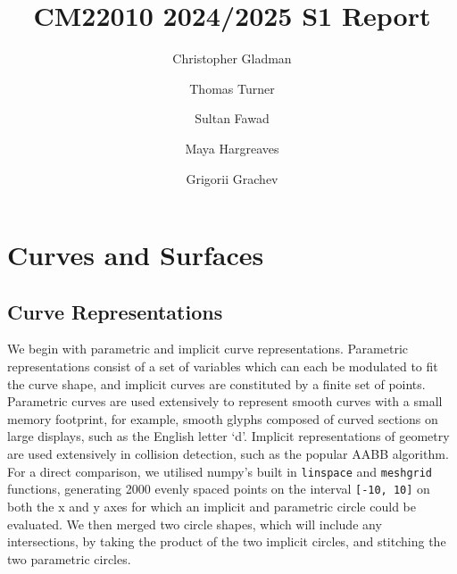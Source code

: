 \documentclass[10pt,a4paper]{article}
\begin{document}
\title{CM22010 2024/2025 S1 Report}
\author{Christopher Gladman}
\author{Thomas Turner}
\author{Sultan Fawad}
\author{Maya Hargreaves}
\author{Grigorii Grachev}
\maketitle

\section{Curves and Surfaces}

\subsection{Curve Representations}
We begin with parametric and implicit curve representations. Parametric representations consist of a set of variables which can each be modulated to fit the curve shape, and implicit curves are constituted by a finite set of points. Parametric curves are used extensively to represent smooth curves with a small memory footprint, for example, smooth glyphs composed of curved sections on large displays, such as the English letter ‘d’.  Implicit representations of geometry are used extensively in collision detection, such as the popular AABB algorithm. For a direct comparison, we utilised numpy’s built in \texttt{linspace} and \texttt{meshgrid} functions, generating 2000 evenly spaced points on the interval \texttt{[-10, 10]} on both the x and y axes for which an implicit and parametric circle could be evaluated. We then merged two circle shapes, which will include any intersections, by taking the product of the two implicit circles, and stitching the two parametric circles.
\end{document}
